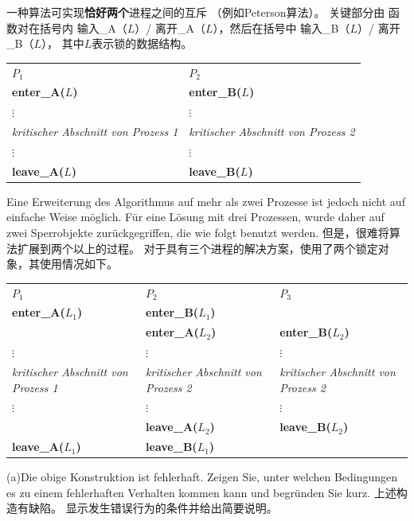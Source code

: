 \documentclass[fleqn]{article}
\begin{document}
一种算法可实现\textbf {恰好两个}进程之间的互斥
（例如Peterson算法）。 关键部分由
函数对在括号内 输入\_A（$ L $）/ 离开\_A（$ L $），然后在括号中 输入\_B（$ L $）/ 离开\_B（$ L $），
其中$ L $表示锁的数据结构。


\begin{center}
    \begin{tabular}{l|l}
        $P_1$&$P_2$\\
        \textbf{enter\_A($L$)}&\textbf{enter\_B($L$)}\\
        $\vdots$&$\vdots$\\
        \textit{kritischer Abschnitt von Prozess 1}&\textit{kritischer Abschnitt von Prozess 2}\\
        $\vdots$&$\vdots$\\
        \textbf{leave\_A($L$)}&\textbf{leave\_B($L$)}
    \end{tabular}
\end{center}

Eine Erweiterung des Algorithmus auf mehr als zwei Prozesse ist jedoch nicht auf einfache Weise möglich. Für eine Lösung mit drei Prozessen, wurde daher auf zwei Sperrobjekte zurückgegriffen, die wie folgt benutzt werden.
但是，很难将算法扩展到两个以上的过程。 对于具有三个进程的解决方案，使用了两个锁定对象，其使用情况如下。

\begin{center}
    \begin{tabular}{l|l|l}
        $P_1$&$P_2$&$P_3$\\
        \textbf{enter\_A($L_1$)}&\textbf{enter\_B($L_1$)}\\
        &\textbf{enter\_A($L_2$)}&\textbf{enter\_B($L_2$)}\\
        $\vdots$&$\vdots$&$\vdots$\\
        \textit{kritischer Abschnitt von Prozess 1}&\textit{kritischer Abschnitt von Prozess 2}&\textit{kritischer Abschnitt von Prozess 2}\\
        $\vdots$&$\vdots$&$\vdots$\\
        &\textbf{leave\_A($L_2$)}&\textbf{leave\_B($L_2$)}\\
        \textbf{leave\_A($L_1$)}&\textbf{leave\_B($L_1$)}
    \end{tabular}
\end{center}

(a)Die obige Konstruktion ist fehlerhaft. Zeigen Sie, unter welchen Bedingungen es zu einem fehlerhaften Verhalten kommen kann und begründen Sie kurz.
上述构造有缺陷。 显示发生错误行为的条件并给出简要说明。
\end{document}
